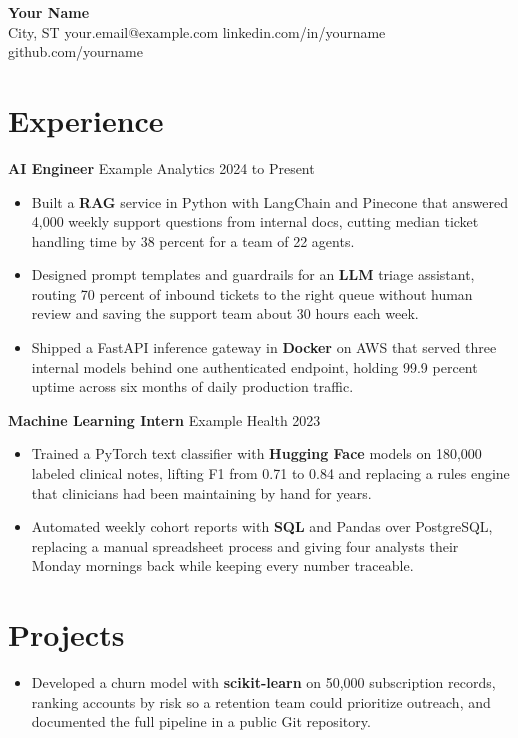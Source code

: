 \documentclass[letterpaper,11pt]{article}
\newcommand{\resumeItem}[1]{\item\small{#1}}
\begin{document}
\begin{center}
  {\Large \textbf{Your Name}} \\
  City, ST \quad your.email@example.com \quad linkedin.com/in/yourname \quad github.com/yourname
\end{center}

\section*{Experience}
\textbf{AI Engineer} \hfill Example Analytics \hfill 2024 to Present
\begin{itemize}[leftmargin=0.15in]
  \resumeItem{Built a \textbf{RAG} service in Python with LangChain and Pinecone that answered 4,000 weekly support questions from internal docs, cutting median ticket handling time by 38 percent for a team of 22 agents.}
  \resumeItem{Designed prompt templates and guardrails for an \textbf{LLM} triage assistant, routing 70 percent of inbound tickets to the right queue without human review and saving the support team about 30 hours each week.}
  \resumeItem{Shipped a FastAPI inference gateway in \textbf{Docker} on AWS that served three internal models behind one authenticated endpoint, holding 99.9 percent uptime across six months of daily production traffic.}
\end{itemize}

\textbf{Machine Learning Intern} \hfill Example Health \hfill 2023
\begin{itemize}[leftmargin=0.15in]
  \resumeItem{Trained a PyTorch text classifier with \textbf{Hugging Face} models on 180,000 labeled clinical notes, lifting F1 from 0.71 to 0.84 and replacing a rules engine that clinicians had been maintaining by hand for years.}
  \resumeItem{Automated weekly cohort reports with \textbf{SQL} and Pandas over PostgreSQL, replacing a manual spreadsheet process and giving four analysts their Monday mornings back while keeping every number traceable.}
\end{itemize}

\section*{Projects}
\begin{itemize}[leftmargin=0.15in]
  \resumeItem{Developed a churn model with \textbf{scikit-learn} on 50,000 subscription records, ranking accounts by risk so a retention team could prioritize outreach, and documented the full pipeline in a public Git repository.}
\end{itemize}
\end{document}
